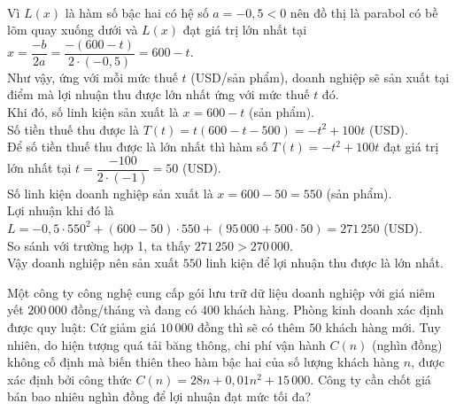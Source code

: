 \begin{ex}
{\begin{eqnarray*}
		\end{eqnarray*}
		Vì $L(x)$ là hàm số bậc hai có hệ số $a = -0{,}5 < 0$ nên đồ thị là parabol có bề lõm quay xuống dưới và $L(x)$ đạt giá trị lớn nhất tại $x = \dfrac{-b}{2a} = \dfrac{-(600 - t)}{2 \cdot (-0{,}5)} = 600 - t$.\\
		Như vậy, ứng với mỗi mức thuế $t$ (USD/sản phẩm), doanh nghiệp sẽ sản xuất tại điểm mà lợi nhuận thu được lớn nhất ứng với mức thuế $t$ đó.\\
		Khi đó, số linh kiện sản xuất là $x = 600 - t$ (sản phẩm).\\
		Số tiền thuế thu được là $T(t) = t(600 - t - 500) = -t^{2} + 100t$ (USD).\\
		Để số tiền thuế thu được là lớn nhất thì hàm số $T(t) = -t^{2} + 100t$ đạt giá trị lớn nhất tại $t = \dfrac{-100}{2 \cdot (-1)} = 50$ (USD).\\
		Số linh kiện doanh nghiệp sản xuất là $x = 600 - 50 = 550$ (sản phẩm).\\
		Lợi nhuận khi đó là $L = -0{,}5 \cdot 550^{2} + (600 - 50) \cdot 550 + (95\,000 + 500 \cdot 50) = 271\,250$ (USD).\\
		So sánh với trường hợp 1, ta thấy $271\,250 > 270\,000$.\\
		Vậy doanh nghiệp nên sản xuất $550$ linh kiện để lợi nhuận thu được là lớn nhất.
	}
\end{ex}

\begin{ex}%
	Một công ty công nghệ cung cấp gói lưu trữ dữ liệu doanh nghiệp với giá niêm yết $200\,000$ đồng/tháng và đang có $400$ khách hàng. Phòng kinh doanh xác định được quy luật: Cứ giảm giá $10\,000$ đồng thì sẽ có thêm $50$ khách hàng mới. Tuy nhiên, do hiện tượng quá tải băng thông, chi phí vận hành $C(n)$ (nghìn đồng) không cố định mà biến thiên theo hàm bậc hai của số lượng khách hàng $n$, được xác định bởi công thức $C(n)=28n+0,01n^2 +15\, 000$. Công ty cần chốt giá bán bao nhiêu nghìn đồng để lợi nhuận đạt mức tối đa?
	\par{}
\end{ex}

